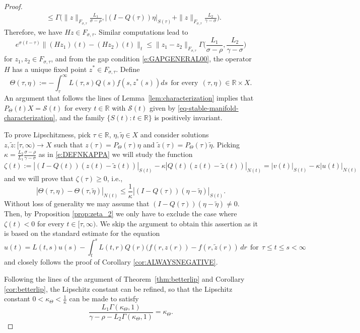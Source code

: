\documentclass[a4paper,11pt,reqno]{amsart}
\theoremstyle{plain}
\theoremstyle{definition}
\numberwithin{equation}{section}
\newcommand{\R}{\mathbb{R}}
\renewcommand{\geq}{\geqslant}
\renewcommand{\leq}{\leqslant}
\begin{document}
\begin{proof}
\begin{equation*}
\begin{aligned}
            &\leq \Gamma\bigg(\|z\|_{F_{\sigma,\tau}}\frac{L_1}{\sigma-\rho}, |(I-Q(\tau))\eta|_{S(\tau)}+\|z\|_{F_{\sigma,\tau}}\frac{L_2}{\gamma-\sigma}\bigg).
        \end{aligned}
    \end{equation*}
{Therefore, we have} $Hz\in F_{\sigma,\tau}$.
Similar computations lead to 
\begin{equation*}
            e^{\sigma (t-\tau)}\|(Hz_1)(t)-(Hz_2)(t)\|_t\leq \|z_1-z_2\|_{F_{\sigma,\tau}}\Gamma\bigg(\frac{L_1}{\sigma-\rho},\frac{L_2}{\gamma-\sigma}\bigg)
    \end{equation*}
for $z_1,z_2\in F_{\sigma,\tau}$, and from the gap condition \eqref{e:GAPGENERAL00}, the operator $H$ has a unique fixed point $z^*\in F_{\sigma,\tau}$.
Define
\begin{equation*}%
\Theta(\tau,\eta ) :=-\int_\tau^\infty L(\tau,s)Q(s)f(s,z^*(s)) ds\ \ \text{for every}\ \   (\tau,\eta)\in \R\times X.
\end{equation*}
An argument that follows the lines of {Lemma~\ref{lem:characterization}} %
implies that $P_\Theta(t) X = \mathcal{S}(t)$ for every $t\in \R$ with $\mathcal{S}(t)$ given by \eqref{eq-stable-manifold-characterization}, and the family $\{S(t)\colon t\in \R\}$ is positively invariant. 

To prove Lipschitzness, pick $\tau\in \R$, $\eta, \tilde \eta \in X$ and consider solutions $z, \tilde{z}:[\tau,\infty)\to X$ such that $z(\tau) = P_\Theta(\tau)\eta$ and $\tilde z(\tau) = P_\Theta(\tau)\tilde \eta$. Picking $\kappa=\frac{L_2}{L_1}\frac{\sigma-\rho}{\gamma-\sigma}$ as in \eqref{e:DEFNKAPPA}
we will 
study the function $\zeta(t):=|(I-Q(t))(z(t)-\tilde z(t))|_{S(t)}-\kappa|Q(t)(z(t)-\tilde z(t))|_{N(t)} = |v(t)|_{S(t)}-\kappa |u(t)|_{N(t)}$ and we will prove that $\zeta(\tau)\geq 0$, i.e., 
$$
|\Theta(\tau,\eta)-\Theta(\tau,\tilde  \eta)|_{N(t)} \leq \frac{1}{\kappa}|(I-Q(\tau))(\eta-\tilde \eta)|_{S(t)}.
$$
Without loss of generality we may assume that {$(I-Q(\tau))(\eta-\tilde \eta) \neq 0$}. Then, by Proposition \ref{prop:zeta_2} we only have to exclude the case where $\zeta(t)<0$ for every $t\in [\tau,\infty)$. We skip the argument to obtain this assertion as it is based on the standard estimate for the equation 
$$
u(t)=L(t,s)u(s)-\int_t^s L(t,r)Q(r)(f(r,z(r))-f(r,\tilde z(r))\, dr\ \ \text{for}\ \ \tau \leq t \leq s < \infty
$$
and closely follows the proof of Corollary \ref{cor:ALWAYSNEGATIVE}. 

Following the lines of the argument of {Theorem~\ref{thm:betterlip} and} Corollary \ref{cor:betterlip}, the Lipschitz constant can be refined, so that the Lipschitz constant $0<\kappa_\Theta<\frac{1}{\kappa}$ can be made to satisfy
\begin{equation*}
    \frac{L_1\Gamma(\kappa_\Theta,1)}{\gamma-\rho-L_2\Gamma(\kappa_\Theta,1)}=\kappa_\Theta.
\end{equation*}


\end{proof}
\end{document}

